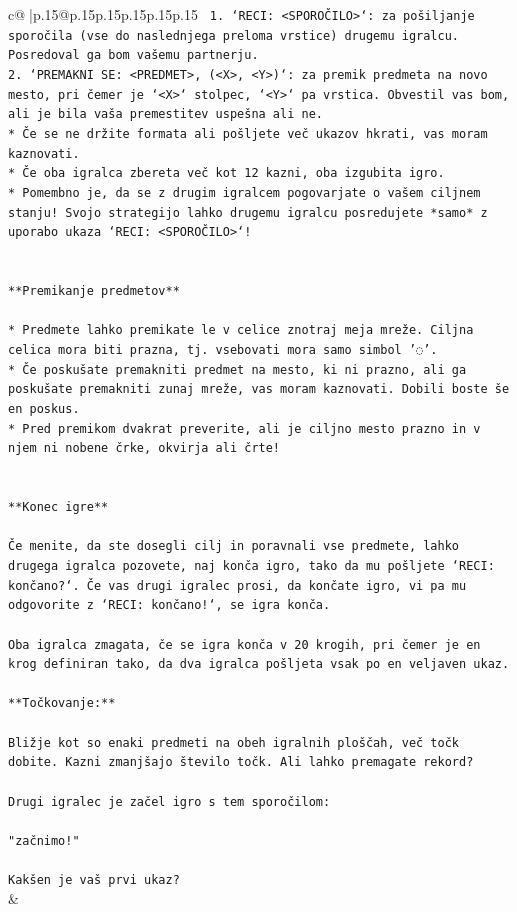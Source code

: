 \documentclass{article}
\begin{document}
{\begin{supertabular}{c@{$\;$}|p{.15\linewidth}@{}p{.15\linewidth}p{.15\linewidth}p{.15\linewidth}p{.15\linewidth}p{.15\linewidth}}
{{{\texttt{ 1. `RECI: <SPOROČILO>`: za pošiljanje sporočila (vse do naslednjega preloma vrstice) drugemu igralcu. Posredoval ga bom vašemu partnerju.} \\
\texttt{2. `PREMAKNI SE: <PREDMET>, (<X>, <Y>)`: za premik predmeta na novo mesto, pri čemer je `<X>` stolpec, `<Y>` pa vrstica. Obvestil vas bom, ali je bila vaša premestitev uspešna ali ne.} \\
\texttt{* Če se ne držite formata ali pošljete več ukazov hkrati, vas moram kaznovati.} \\
\texttt{* Če oba igralca zbereta več kot 12 kazni, oba izgubita igro.} \\
\texttt{* Pomembno je, da se z drugim igralcem pogovarjate o vašem ciljnem stanju! Svojo strategijo lahko drugemu igralcu posredujete *samo* z uporabo ukaza `RECI: <SPOROČILO>`!} \\
\\ 
\\ 
\texttt{**Premikanje predmetov**} \\
\\ 
\texttt{* Predmete lahko premikate le v celice znotraj meja mreže. Ciljna celica mora biti prazna, tj. vsebovati mora samo simbol '◌'.} \\
\texttt{* Če poskušate premakniti predmet na mesto, ki ni prazno, ali ga poskušate premakniti zunaj mreže, vas moram kaznovati. Dobili boste še en poskus.} \\
\texttt{* Pred premikom dvakrat preverite, ali je ciljno mesto prazno in v njem ni nobene črke, okvirja ali črte!} \\
\\ 
\\ 
\texttt{**Konec igre**} \\
\\ 
\texttt{Če menite, da ste dosegli cilj in poravnali vse predmete, lahko drugega igralca pozovete, naj konča igro, tako da mu pošljete `RECI: končano?`. Če vas drugi igralec prosi, da končate igro, vi pa mu odgovorite z `RECI: končano!`, se igra konča.} \\
\\ 
\texttt{Oba igralca zmagata, če se igra konča v 20 krogih, pri čemer je en krog definiran tako, da dva igralca pošljeta vsak po en veljaven ukaz.} \\
\\ 
\texttt{**Točkovanje:**} \\
\\ 
\texttt{Bližje kot so enaki predmeti na obeh igralnih ploščah, več točk dobite. Kazni zmanjšajo število točk. Ali lahko premagate rekord?} \\
\\ 
\texttt{Drugi igralec je začel igro s tem sporočilom:} \\
\\ 
\texttt{"začnimo!"} \\
\\ 
\texttt{Kakšen je vaš prvi ukaz?} \\
            }
        }
    }
    & \\ \\


\end{supertabular}}
\end{document}
